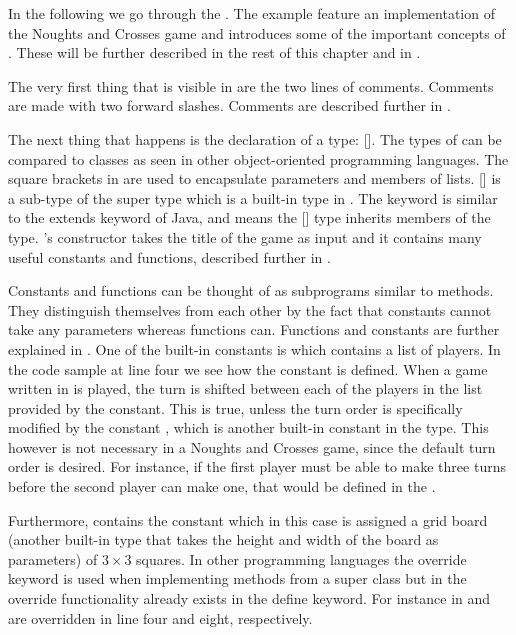 In the following we go through the . The example feature
an implementation of the Noughts and Crosses game and introduces some of the important concepts of \productname{}. These will be
further described in the rest of this chapter and in .

The very first thing that is visible in  are the
two lines of comments. Comments are made with two forward slashes. Comments are
described further in .

The next thing that happens is the declaration of a type: 
[].  The types of \productname{} can be compared to classes as
seen in other object-oriented programming languages. The square brackets in
\productname{} are used to encapsulate parameters and members
of lists.  [] is a sub-type of the super type 
which is a built-in type in \productname{}. The  keyword is
similar to the extends keyword of Java, and means the [] type
inherits members of the  type.  's constructor takes the
title of the game as input and it contains many useful constants and
functions, described further in . 


Constants and functions can be thought of as subprograms similar to methods.
They distinguish themselves from each other by the fact that constants cannot
take any parameters whereas functions can. Functions and constants are further
explained in . One of the built-in constants is
 which contains a list of players. In the code sample at line
four we see how the constant is defined. When a game written in
\productname{} is played, the turn is shifted between each of the players in
the list provided by the  constant. This is true, unless the turn
order is specifically modified by the constant , which is
another built-in constant in the  type. This however is not necessary
in a Noughts and Crosses game, since the default turn order is desired. For instance,
if the first player must be able to make three turns before the second player
can make one, that would be defined in the .

Furthermore,  contains the constant  which in
this case is assigned a grid board (another built-in type that takes the height
and width of the board as parameters) of $3 \times 3$ squares. In other
programming languages the override keyword is used when implementing methods
from a super class but in \productname{} the override functionality
already exists in the define keyword. For instance in
  and  are
overridden in line four and eight, respectively.

